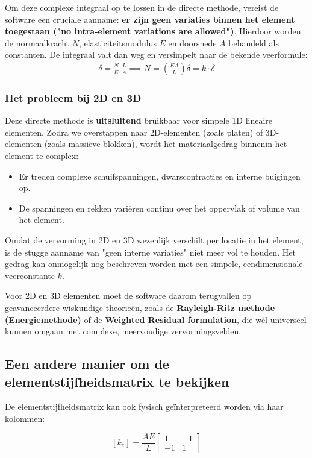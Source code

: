 \documentclass[a4paper,11pt,twoside]{report}
\begin{document}
Om deze complexe integraal op te lossen in de directe methode, vereist de software een cruciale
aanname: \textbf{er zijn geen variaties binnen het element toegestaan ("no intra-element variations
    are allowed")}. Hierdoor worden de normaalkracht $N$, elasticiteitsmodulus $E$ en doorsnede $A$
behandeld als constanten. De integraal valt dan weg en versimpelt naar de bekende veerformule:
\begin{align*}
    \delta = \frac{N \cdot L}{E \cdot A} \implies N = \left(\frac{EA}{L}\right) \delta = k \cdot \delta
\end{align*}

\subsubsection*{Het probleem bij 2D en 3D}
Deze directe methode is \textbf{uitsluitend} bruikbaar voor simpele 1D lineaire elementen. Zodra we
overstappen naar 2D-elementen (zoals platen) of 3D-elementen (zoals massieve blokken), wordt het
materiaalgedrag binnenin het element te complex:
\begin{itemize}
    \item Er treden complexe schuifspanningen, dwarscontracties en interne buigingen op.
    \item De spanningen en rekken variëren continu over het oppervlak of volume van het element.
\end{itemize}

Omdat de vervorming in 2D en 3D wezenlijk verschilt per locatie in het element, is de stugge aanname
van "geen interne variaties" niet meer vol te houden. Het gedrag kan onmogelijk nog beschreven
worden met een simpele, eendimensionale veerconstante $k$.

Voor 2D en 3D elementen moet de software daarom terugvallen op geavanceerdere wiskundige theorieën,
zoals de \textbf{Rayleigh-Ritz methode (Energiemethode)} of de \textbf{Weighted Residual
    formulation}, die wél universeel kunnen omgaan met complexe, meervoudige vervormingsvelden.
\subsection{Een andere manier om de elementstijfheidsmatrix te bekijken}

De elementstijfheidsmatrix kan ook fysisch geïnterpreteerd worden via haar kolommen:

\[
    [k_e]
    =
    \frac{AE}{L}
    \begin{bmatrix}
        1  & -1 \\
        -1 & 1
    \end{bmatrix}
\]
\end{document}
